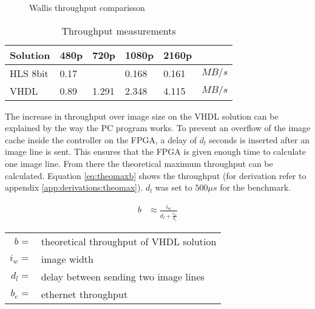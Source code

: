\begin{figure}[tb!]
    \centering
    \begin{adjustbox}{max width=\linewidth}
        
    \end{adjustbox}
    \caption{Wallis throughput comparisson}
    \label{fig:benchmarkcompare}
\end{figure}

\begin{table}[tb!]
    \centering
    \begin{tabular}{l l l l l l}
        \toprule
        Solution & 480p & 720p & 1080p & 2160p & \\
        \midrule
        HLS 8bit   & 0.17  &       & 0.168 & 0.161 & $MB/s$ \\
        VHDL       & 0.89  & 1.291 & 2.348 & 4.115 & $MB/s$\\
        \bottomrule
    \end{tabular}
    \caption{Throughput measurements}
    \label{tab:throughputmeasuremetns}
\end{table}

The increase in throughput over image size on the VHDL solution can be explained
by the way the
PC program works. To prevent an overflow of the image cache inside the
controller on the FPGA, a delay of $d_l$ seconds is inserted after an image line
is sent. This ensures that the FPGA is given enough time to calculate one image
line. From there the theoretical maximum throughput can be calculated. Equation
\ref{eq:theomaxb} shows the throughput (for derivation refer to appendix 
\ref{app:derivations:theomax}). $d_l$ was set to $500\mu s$ for the benchmark.

\begin{align}
    b  & \approx \frac{i_w}{d_l + \frac{i_w}{b_e}}
    \label{eq:theomaxb}
\end{align}

\begin{tabular}{rl}
    $b     =$ & theoretical throughput of VHDL solution \\
    $i_w   =$ & image width \\
    $d_l   =$ & delay between sending two image lines \\
    $b_e   =$ & ethernet throughput \\
\end{tabular} \\


